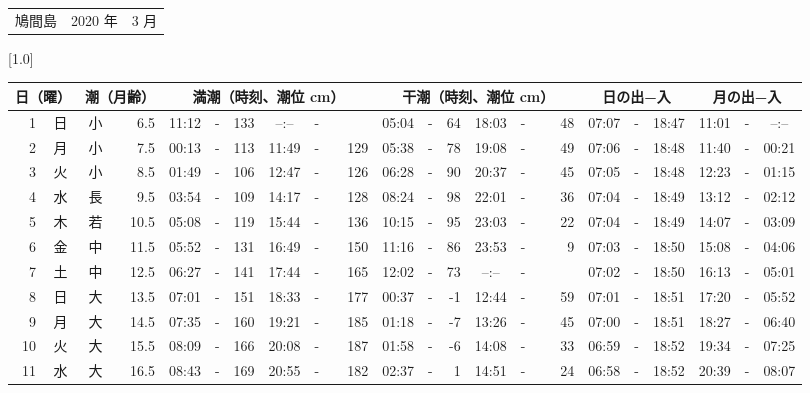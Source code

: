 \documentclass[12pt,a4j]{jsarticle}
\begin{document}
 \begin{table}[htbp]
 \begin{center}
 \begin{tabular}{lcc}
 \LARGE{鳩間島}  & \large{2020 年} & \large{ 3 月} \\
 \end{tabular}
 \end{center}
 \begin{center}
    \scalebox{0.7}[1.0]{
    \begin{tabular}{|rc|cr|ccrccr|ccrccr|ccc|ccc|}
    \hline
    \multicolumn{2}{|c|}{日（曜）} & \multicolumn{2}{c|}{潮（月齢）} & \multicolumn{6}{c|}{満潮（時刻、潮位 cm）} & \multicolumn{6}{c|}{干潮（時刻、潮位 cm）} & \multicolumn{3}{c|}{日の出−入} &  \multicolumn{3}{c|}{月の出−入}\\
 \hline
 1 & 日 & 小 &  6.5 &  11:12 &-& 133 &  --:-- &-&~~~~~ &  05:04 &-&  64 &  18:03 &-&  48 & 07:07 & -& 18:47 & 11:01 & -& --:-- \\
 2 & 月 & 小 &  7.5 &  00:13 &-& 113 &  11:49 &-& 129 &  05:38 &-&  78 &  19:08 &-&  49 & 07:06 & -& 18:48 & 11:40 & -& 00:21 \\
 3 & 火 & 小 &  8.5 &  01:49 &-& 106 &  12:47 &-& 126 &  06:28 &-&  90 &  20:37 &-&  45 & 07:05 & -& 18:48 & 12:23 & -& 01:15 \\
 4 & 水 & 長 &  9.5 &  03:54 &-& 109 &  14:17 &-& 128 &  08:24 &-&  98 &  22:01 &-&  36 & 07:04 & -& 18:49 & 13:12 & -& 02:12 \\
 5 & 木 & 若 & 10.5 &  05:08 &-& 119 &  15:44 &-& 136 &  10:15 &-&  95 &  23:03 &-&  22 & 07:04 & -& 18:49 & 14:07 & -& 03:09 \\
 6 & 金 & 中 & 11.5 &  05:52 &-& 131 &  16:49 &-& 150 &  11:16 &-&  86 &  23:53 &-&   9 & 07:03 & -& 18:50 & 15:08 & -& 04:06 \\
 7 & 土 & 中 & 12.5 &  06:27 &-& 141 &  17:44 &-& 165 &  12:02 &-&  73 &  --:-- &-&~~~~~ & 07:02 & -& 18:50 & 16:13 & -& 05:01 \\
 8 & 日 & 大 & 13.5 &  07:01 &-& 151 &  18:33 &-& 177 &  00:37 &-&  -1 &  12:44 &-&  59 & 07:01 & -& 18:51 & 17:20 & -& 05:52 \\
 9 & 月 & 大 & 14.5 &  07:35 &-& 160 &  19:21 &-& 185 &  01:18 &-&  -7 &  13:26 &-&  45 & 07:00 & -& 18:51 & 18:27 & -& 06:40 \\
10 & 火 & 大 & 15.5 &  08:09 &-& 166 &  20:08 &-& 187 &  01:58 &-&  -6 &  14:08 &-&  33 & 06:59 & -& 18:52 & 19:34 & -& 07:25 \\
11 & 水 & 大 & 16.5 &  08:43 &-& 169 &  20:55 &-& 182 &  02:37 &-&   1 &  14:51 &-&  24 & 06:58 & -& 18:52 & 20:39 & -& 08:07 \\

\end{tabular}}
\end{center}
\end{table}
\end{document}
